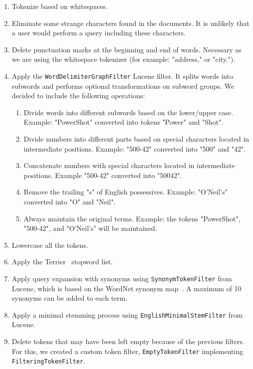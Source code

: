 \begin{enumerate}
    \item Tokenize based on whitespaces.
    \item Eliminate some strange characters found in the documents.
          It is unlikely that a user would perform a query including these characters.
    \item Delete punctuation marks at the beginning and end of words.
          Necessary as we are using the whitespace tokenizer (for example: "address," or "city.").
    \item Apply the \texttt{WordDelimiterGraphFilter} Lucene filter.
          It splits words into subwords and performs optional transformations on subword groups.
          We decided to include the following operations:
          \begin{enumerate}
              \item Divide words into different subwords based on the lower/upper case.
                    Example: "PowerShot" converted into tokens "Power" and "Shot".
              \item Divide numbers into different parts based on special characters located in intermediate positions.
                    Example: "500-42" converted into "500" and "42".
              \item Concatenate numbers with special characters located in intermediate positions.
                    Example "500-42" converted into "50042".
              \item Remove the trailing "s" of English possessives.
                    Example: "O'Neil's" converted into "O" and "Neil".
              \item Always maintain the original terms.
                    Example: the tokens "PowerShot", "500-42", and "O'Neil's" will be maintained.
          \end{enumerate}
    \item Lowercase all the tokens.
    \item Apply the Terrier~\cite{OunisEtAl2006} stopword list.
    \item Apply query expansion with synonyms using \texttt{SynonymTokenFilter} from Lucene, which is based on the
          WordNet synonym map~\cite{wordnet}.
          A maximum of 10 synonyms can be added to each term.
    \item Apply a minimal stemming process using \texttt{EnglishMinimalStemFilter} from Lucene.
    \item Delete tokens that may have been left empty because of the previous filters.
          For this, we created a custom token filter, \texttt{EmptyTokenFilter} implementing \texttt{FilteringTokenFilter}.
\end{enumerate}

